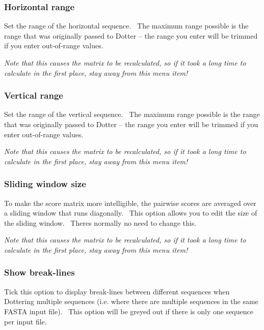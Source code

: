 \documentclass{report}
\begin{document}
\bigskip

{\color[rgb]{0.30980393,0.5058824,0.7411765}\subsubsection[Horizontal range]{Horizontal range}}
{Set the range of the horizontal sequence. \ The maximum range possible
is the range that was originally passed to Dotter -- the range you
enter will be trimmed if you enter out-of-range values.}

\bigskip

{\itshape
Note that this causes the matrix to be recalculated, so if it took a
long time to calculate in the first place, stay away from this menu
item!}

\bigskip

{\color[rgb]{0.30980393,0.5058824,0.7411765}\subsubsection[Vertical range]{Vertical range}}
{Set the range of the vertical sequence. \ The maximum range possible is
the range that was originally passed to Dotter -- the range you enter
will be trimmed if you enter out-of-range values.}

\bigskip

{\itshape
Note that this causes the matrix to be recalculated, so if it took a
long time to calculate in the first place, stay away from this menu
item!}

\bigskip

{\color[rgb]{0.30980393,0.5058824,0.7411765}\subsubsection[Sliding window size]{Sliding window size}}
{To make the score matrix more intelligible, the pairwise scores are
averaged over a sliding window that runs diagonally. \ This option
allows you to edit the size of the sliding window.
\ There{\textquotesingle}s normally no need to change this.}

\bigskip

{\itshape
Note that this causes the matrix to be recalculated, so if it took a
long time to calculate in the first place, stay away from this menu
item!}

\bigskip

{\color[rgb]{0.30980393,0.5058824,0.7411765}\subsubsection[Show break{}-lines]{Show break-lines}}
{Tick this option to display break-lines between different sequences when
Dottering multiple sequences (i.e. where there are multiple sequences
in the same FASTA input file). \ This option will be greyed out if
there is only one sequence per input file.}
\end{document}
